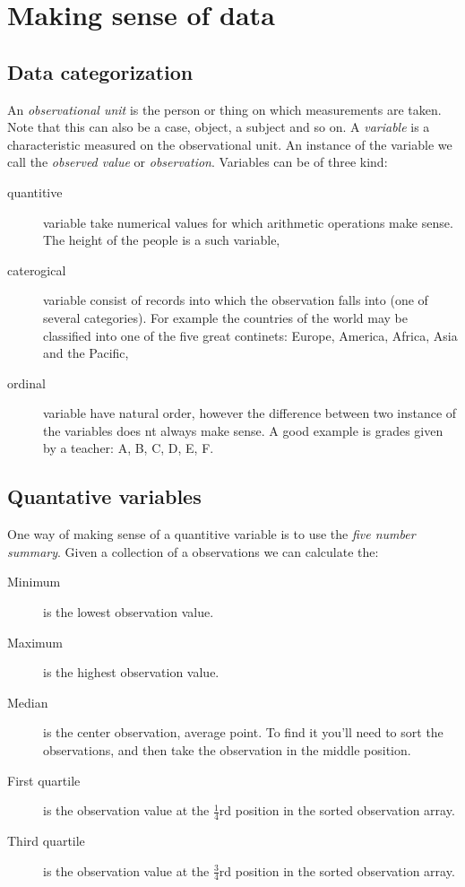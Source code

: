 \section{Making sense of data}

\subsection{Data categorization}

An \emph{observational unit} is the person or thing on which measurements are
taken. Note that this can also be a case, object, a subject and so on. A
\emph{variable} is a characteristic measured on the observational unit. An
instance of the variable we call the \emph{observed value} or
\emph{observation}. Variables can be of three kind:

\begin{description}
  \item[quantitive] variable take numerical values for which arithmetic
  operations make sense. The height of the people is a such variable,
  \item[caterogical] variable consist of records into which the observation
  falls into (one of several categories). For example the countries of the
  world may be classified into one of the five great continets: Europe, America,
  Africa, Asia and the Pacific,
  \item[ordinal] variable have natural order, however the difference between two
  instance of the variables does nt always make sense. A good example is grades
  given by a teacher: A, B, C, D, E, F.
   
\end{description}

\subsection{Quantative variables}

One way of making sense of a quantitive variable is to use the \emph{five
number summary}. Given a collection of a observations we can calculate the: 

\begin{description}
  \item[Minimum] is the lowest observation value.
  \item[Maximum] is the highest observation value.
  \item[Median] is the center observation, average point. To find it you'll need
  to sort the observations, and then take the observation in the middle
  position.
  \item[First quartile] is the observation value at the $\frac{1}{4}$rd position
  in the sorted observation array.
  \item[Third quartile] is the observation value at the $\frac{3}{4}$rd position
  in the sorted observation array.
\end{description}

